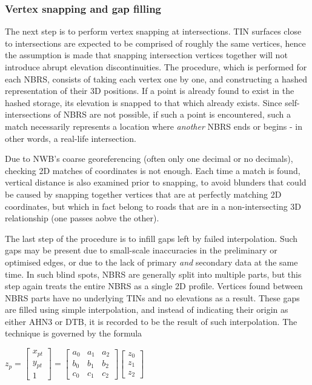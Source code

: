 \subsubsection{Vertex snapping and gap filling}

The next step is to perform vertex snapping at intersections. TIN surfaces close to intersections are expected to be comprised of roughly the same vertices, hence the assumption is made that snapping intersection vertices together will not introduce abrupt elevation discontinuities. The procedure, which is performed for each NBRS, consists of taking each vertex one by one, and constructing a hashed representation of their 3D positions. If a point is already found to exist in the hashed storage, its elevation is snapped to that which already exists. Since self-intersections of NBRS are not possible, if such a point is encountered, such a match necessarily represents a location where \textit{another} NBRS ends or begins - in other words, a real-life intersection.

Due to NWB's coarse georeferencing (often only one decimal or no decimals), checking 2D matches of coordinates is not enough. Each time a match is found, vertical distance is also examined prior to snapping, to avoid blunders that could be caused by snapping together vertices that are at perfectly matching 2D coordinates, but which in fact belong to roads that are in a non-intersecting 3D relationship (one passes aobve the other).

The last step of the procedure is to infill gaps left by failed interpolation. Such gaps may be present due to small-scale inaccuracies in the preliminary or optimised edges, or due to the lack of primary \textit{and} secondary data at the same time. In such blind spots, NBRS are generally split into multiple parts, but this step again treats the entire NBRS as a single 2D profile. Vertices found between NBRS parts have no underlying TINs and no elevations as a result. These gaps are filled using simple interpolation, and instead of indicating their origin as either AHN3 or DTB, it is recorded to be the result of such interpolation. The technique is governed by the formula

$z_{p} =
\begin{bmatrix}
x_{pt}\\
y_{pt}\\ 
1
\end{bmatrix} =
\begin{bmatrix}
 a_{0} & a_{1} & a_{2} \\
 b_{0} & b_{1} & b_{2} \\
 c_{0} & c_{1} & c_{2}  
\end{bmatrix}
\begin{bmatrix}
z_{0}\\
z_{1}\\ 
z_{2}
\end{bmatrix}$


